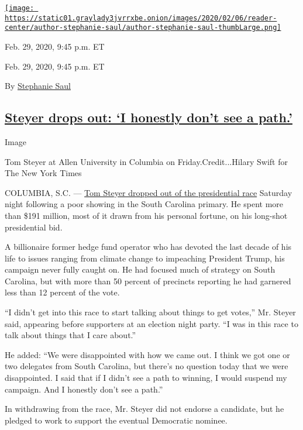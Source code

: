 \href{https://www.nytimes3xbfgragh.onion/by/stephanie-saul}{\texttt{[image: https://static01.graylady3jvrrxbe.onion/images/2020/02/06/reader-center/author-stephanie-saul/author-stephanie-saul-thumbLarge.png]}}

Feb. 29, 2020, 9:45 p.m. ET

Feb. 29, 2020, 9:45 p.m. ET

By \href{https://www.nytimes3xbfgragh.onion/by/stephanie-saul}{Stephanie
Saul}

\hypertarget{steyer-drops-out-i-honestly-dont-see-a-path}{%
\subsection{\texorpdfstring{\protect\hyperlink{tom-steyer}{Steyer drops
out: `I honestly don't see a
path.'}}{Steyer drops out: `I honestly don't see a path.'}}\label{steyer-drops-out-i-honestly-dont-see-a-path}}

Image

Tom Steyer at Allen University in Columbia on Friday.Credit...Hilary
Swift for The New York Times

COLUMBIA, S.C. ---
\href{https://www.nytimes3xbfgragh.onion/2020/02/29/us/politics/tom-steyer-drops-out.html}{Tom
Steyer dropped out of the presidential race} Saturday night following a
poor showing in the South Carolina primary. He spent more than \$191
million, most of it drawn from his personal fortune, on his long-shot
presidential bid.

A billionaire former hedge fund operator who has devoted the last decade
of his life to issues ranging from climate change to impeaching
President Trump, his campaign never fully caught on. He had focused much
of strategy on South Carolina, but with more than 50 percent of
precincts reporting he had garnered less than 12 percent of the vote.

``I didn't get into this race to start talking about things to get
votes,'' Mr. Steyer said, appearing before supporters at an election
night party. ``I was in this race to talk about things that I care
about.''

He added: ``We were disappointed with how we came out. I think we got
one or two delegates from South Carolina, but there's no question today
that we were disappointed. I said that if I didn't see a path to
winning, I would suspend my campaign. And I honestly don't see a path.''

In withdrawing from the race, Mr. Steyer did not endorse a candidate,
but he pledged to work to support the eventual Democratic nominee.


